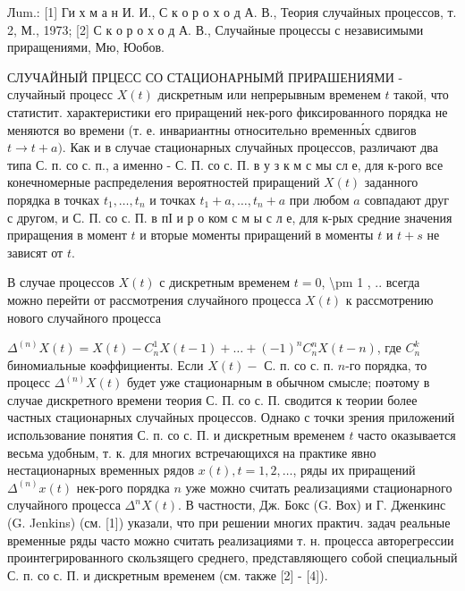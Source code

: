 \documentclass[10pt]{article}
\begin{document}
Лum.: [1] Ги х м а н И. И., С к о р о х о д А. В., Теория случайных процессов, т. 2, М., 1973; [2] С к о р о х о д А. В., Случайные процессы с независимыми приращениями, Мю, Юобов.



СЛУЧАЙНЫЙ ПРЦЕСС СО СТАЦИОНАРНЫМЙ ПРИРАШЕНИЯМИ - случайный процесс $X(t)$ дискретным или непрерывным временем $t$ такой, что статистит. характеристики его приращений нек-рого фиксированного порядка не меняются во времени (т. е. инвариантны относительно временны́х сдвигов $t \rightarrow t+a)$. Как и в случае стационарных случайных процессов, различают два типа С. п. со с. п., а именно - С. П. со с. П. в у з к м с мы сл е, для к-рого все конечномерные распределения вероятностей приращений $X(t)$ заданного порядка в точках $t_{1}, \ldots, t_{n}$ и точках $t_{1}+a, \ldots, t_{n}+a$ при любом $a$ совпадают друг с другом, и С. П. со с. П. в пІ и р о ком с м ы с л е, для к-рых средние значения приращения в момент $t$ и вторые моменты приращений в моменты $t$ и $t+s$ не зависят от $t$.



В случае процессов $X(t)$ с дискретным временем $t=0$, \textbackslash pm 1 , .. всегда можно перейти от рассмотрения случайного процесса $X(t)$ к рассмотрению нового случайного процесса



$\Delta^{(n)} X(t)=X(t)-C_{n}^{1} X(t-1)+\ldots+(-1)^{n} C_{n}^{n} X(t-n)$, где $C_{n}^{k}$ биномиальные коәффициенты. Если $X(t)-$ С. п. со с. п. $n$-го порядка, то процесс $\Delta^{(n)} X(t)$ будет уже стационарным в обычном смысле; поәтому в случае дискретного времени теория С. П. со с. П. сводится к теории более частных стационарных случайных процессов. Однако с точки зрения приложений использование понятия С. п. со с. П. и дискретным временем $t$ часто оказывается весьма удобным, т. к. для многих встречающихся на практике явно нестационарных временных рядов $x(t), t=1,2, \ldots$, ряды их приращений $\Delta^{(n)} x(t)$ нек-рого порядка $n$ уже можно считать реализациями стационарного случайного процесса $\Delta^{n} X(t)$. В частности, Дж. Бокс (G. Вох) и Г. Дженкинс (G. Jenkins) (см. [1]) указали, что при решении многих практич. задач реальные временные ряды часто можно считать реализациями т. н. процесса авторегрессии проинтегрированного скользящего среднего, представляющего собой специальный С. п. со с. П. и дискретным временем (см. также [2] - [4]).
\end{document}
